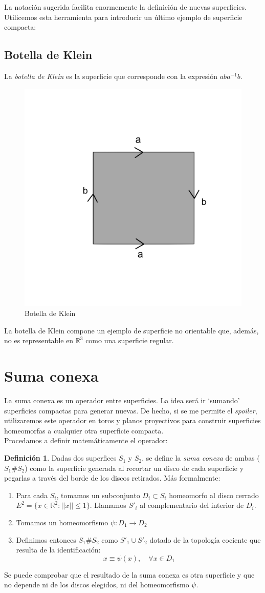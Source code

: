 \documentclass[a4paper,11pt,spanish, twoside, leqno]{tfg-uam}
\newcommand*{\reales}{\mathbb{R}}
\theoremstyle{definition}
\newtheorem{defin}[teor]{Definici\'on}
\begin{document}
La notación sugerida facilita enormemente la definición de nuevas superficies. Utilicemos esta herramienta para introducir un último ejemplo de superficie compacta:


\subsection*{Botella de Klein}
La \textit{botella de Klein} es la superficie que corresponde con la expresión $ aba^{-1}b $.
\begin{figure}[h!]
	\centering
	\includegraphics[width=0.2\linewidth]{imagenes/klein.png}
	\caption{Botella de Klein}
	\label{fig:botelladeklein expresion canónica}
\end{figure} 

La botella de Klein compone un ejemplo de superficie no orientable que, además, no es representable en $\reales^3$ como una superficie regular.

\section{Suma conexa}
\label{sec:sumaconexa}
La suma conexa es un operador entre superficies. La idea será ir `sumando' superficies compactas para generar nuevas. De hecho, si se me permite el \textit{spoiler}, utilizaremos este operador en toros y planos proyectivos para construir superficies homeomorfas a cualquier otra superficie compacta.\\
Procedamos a definir matemáticamente el operador:

\begin{defin}\label{defin:sumaconexa}
Dadas dos superfices $S_1$ y $S_2$, se define la \textit{suma conexa} de ambas ($S_1\#S_2$) como la superficie generada al recortar un disco de cada superficie y pegarlas a través del borde de los discos retirados. Más formalmente:
\begin{enumerate}
\item  Para cada $S_i$, tomamos un subconjunto $D_i\subset S_i$ homeomorfo al disco cerrado $E^2=\{x\in\mathbb{R}^2: ||x||\leq 1\}$. Llamamos $S'_i$ al complementario del interior de $D_i$.

\item Tomamos un homeomorfismo $\psi:D_1\longrightarrow D_2$

\item Definimos entonces $S_1\#S_2$ como $S'_1\cup S'_2$ dotado de la topología cociente que resulta de la identificación:
\[ x \equiv  \psi(x), \quad \forall x \in D_1 \] 
\end{enumerate}
Se puede comprobar que el resultado de la suma conexa es otra superficie y que no depende ni de los discos elegidos, ni del homeomorfismo $\psi$.
\end{defin}
\end{document}
